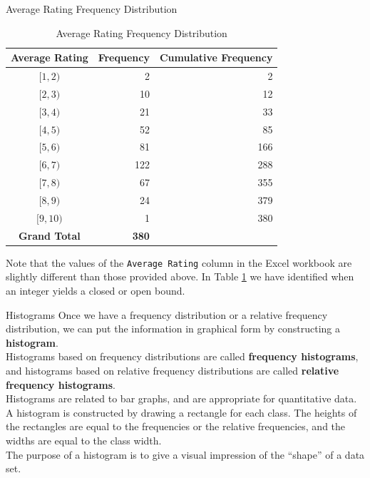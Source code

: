 \documentclass[pdf]{beamer}
\newcommand{\empr}[1]{{\color{franklinblue}\textbf{#1}}}
\theoremstyle{remark}
\theoremstyle{definition}
\begin{document}
\begin{frame}{Average Rating Frequency Distribution}
\small
\begin{table}[htbp]
  \centering
  \captionsetup{justification=centering}
    \begin{tabular}{crr}
    \rowcolor[rgb]{ .851,  .882,  .949} \textbf{Average Rating} & \multicolumn{1}{l}{\textbf{Frequency}} &  \multicolumn{1}{l}{\textbf{Cumulative Frequency}}\\
    \midrule
   $[1,2)$   & 2 & 2 \\
   $[2,3)$   & 10 & 12 \\
   $[3,4)$   & 21 & 33 \\
   $[4,5)$   & 52 & 85 \\
   $[5,6)$   & 81 & 166 \\
   $[6,7)$   & 122 & 288 \\
   $[7,8)$  & 67 & 355 \\
   $[8,9)$   & 24 & 379 \\
    $[9,10)$  & 1 & 380 \\
    \midrule
    \rowcolor[rgb]{ .851,  .882,  .949} \textbf{Grand Total} & \textbf{380} & \\
    \end{tabular}%
    \caption{Average Rating Frequency Distribution}
  \label{tab:arfd}%
\end{table}%
\vspace{-2ex}
\normalsize
Note that the values of the \texttt{Average Rating} column in the Excel workbook are slightly different than those provided above.  In Table \ref{tab:arfd} we have identified when an integer yields a closed or open bound. 
\end{frame}

\begin{frame}[t]{Histograms}
Once we have a frequency distribution or a relative frequency distribution, we can put the information in graphical form by constructing a \empr{histogram}.\\
\vspace{1.5ex}
Histograms based on frequency distributions are called \empr{frequency histograms}, and histograms based on relative frequency distributions are called \empr{relative frequency histograms}. \\
\vspace{1.5ex}
Histograms are related to bar graphs, and are appropriate for quantitative data. A histogram is constructed by drawing a rectangle for each class. The heights of the rectangles are equal to the frequencies or the relative frequencies, and the widths are equal to the class width. \\
\vspace{1.5ex}
The purpose of a histogram is to give a visual impression of the ``shape'' of a data set.
\end{frame}
\end{document}
